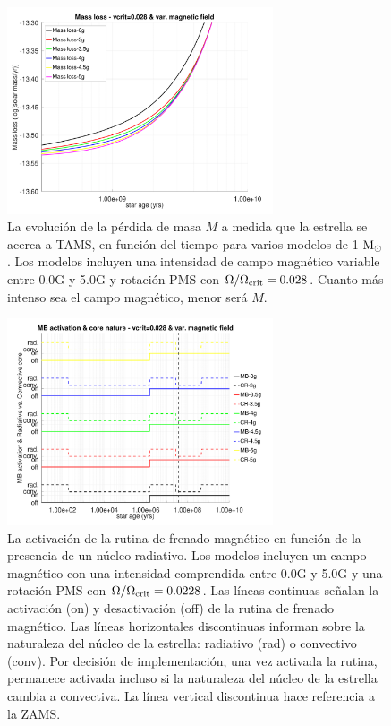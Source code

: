 \begin{figure}
    \centering
    \includegraphics[width=0.7\textwidth]{img/paper1/mdot_vc_028_var_g_z1.pdf}
	\caption{La evolución de la pérdida de masa $\Dot{M}$ a medida que la estrella se acerca a TAMS, en función del tiempo para varios modelos de 1 $\mathrm{M}_\odot$. Los modelos incluyen una intensidad de campo magnético variable entre 0.0G y 5.0G y rotación PMS con $\Omega / \Omega_{\mathrm{crit}}=0.028$. Cuanto más intenso sea el campo magnético, menor será $\Dot{M}$.}
	\label{fig:mdot_vc_028_var_b_z1}
\end{figure}

\begin{figure}
    \centering
    \includegraphics[width=0.7\textwidth]{img/paper1/mb_act_vc_028_var_g.pdf}
	\caption{La activación de la rutina de frenado magnético en función de la presencia de un núcleo radiativo. Los modelos incluyen un campo magnético con una intensidad comprendida entre 0.0G y 5.0G y una rotación PMS con $\Omega / \Omega_{\mathrm{crit}}=0.0228$. Las líneas continuas señalan la activación (on) y desactivación (off) de la rutina de frenado magnético. Las líneas horizontales discontinuas informan sobre la naturaleza del núcleo de la estrella: radiativo (rad) o convectivo (conv). Por decisión de implementación, una vez activada la rutina, permanece activada incluso si la naturaleza del núcleo de la estrella cambia a convectiva. La línea vertical discontinua hace referencia a la ZAMS.}
	\label{fig:mb_act_var_vel_vc_028}
\end{figure}

